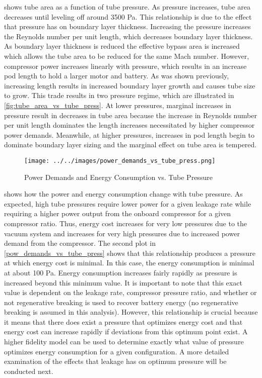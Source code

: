  shows tube area as a function of tube pressure. As pressure increases, tube area decreases until leveling off around 3500 Pa. This relationship is due to the effect that pressure has on boundary layer thickness. Increasing the pressure increases the Reynolds number per unit length, which decreases boundary layer thickness. As boundary layer thickness is reduced the effective bypass area is increased which allows the tube area to be reduced for the same Mach number. However, compressor power increases linearly with pressure, which results in an increase pod length to hold a larger motor and battery. As was shown previously, increasing length results in increased boundary layer growth and causes tube size to grow. This trade results in two pressure regime, which are illustrated in \cref{fig:tube_area_vs_tube_press}. At lower pressures, marginal increases in pressure result in decreases in tube area because the increase in Reynolds number per unit length dominates the length increases necessitated by higher compressor power demands. Meanwhile, at higher pressures, increases in pod length begin to dominate boundary layer sizing and the marginal effect on tube area is tempered.
\begin{figure}
	\centering
	\texttt{[image: ../../images/power\_demands\_vs\_tube\_press.png]}
	\caption{Power Demands and Energy Consumption vs. Tube Pressure}
	\label{fig:pow_demands_vs_tube_press}
\end{figure}
 shows how the power and energy consumption change with tube pressure. As expected, high tube pressures require lower power for a given leakage rate while requiring a higher power output from the onboard compressor for a given compressor ratio. Thus, energy cost increases for very low pressures due to the vacuum system and increases for very high pressures due to increased power demand from the compressor. The second plot in \cref{pow_demands_vs_tube_press} shows that this relationship produces a pressure at which energy cost is minimal. In this case, the energy consumption is minimal at about 100 Pa. Energy consumption increases fairly rapidly as pressure is increased beyond this minimum value. It is important to note that this exact value is dependent on the leakage rate, compressor pressure ratio, and whether or not regenerative breaking is used to recover battery energy (no regenerative breaking is assumed in this analysis). However, this relationship is crucial because it means that there does exist a pressure that optimizes energy cost and that energy cost can increase rapidly if deviations from this optimum point exist. A higher fidelity model can be used to determine exactly what value of pressure optimizes energy consumption for a given configuration. A more detailed examination of the effects that leakage has on optimum pressure will be conducted next.

